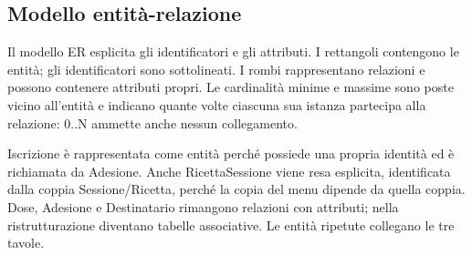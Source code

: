 \documentclass[11pt,a4paper]{article}
\begin{document}
\begin{landscape}
\subsection{Modello entità-relazione}
Il modello ER esplicita gli identificatori e gli attributi. I rettangoli contengono le entità; gli identificatori sono sottolineati. I rombi rappresentano relazioni e possono contenere attributi propri. Le cardinalità minime e massime sono poste vicino all'entità e indicano quante volte ciascuna sua istanza partecipa alla relazione: 0..N ammette anche nessun collegamento.

Iscrizione è rappresentata come entità perché possiede una propria identità ed è richiamata da Adesione. Anche RicettaSessione viene resa esplicita, identificata dalla coppia Sessione/Ricetta, perché la copia del menu dipende da quella coppia. Dose, Adesione e Destinatario rimangono relazioni con attributi; nella ristrutturazione diventano tabelle associative. Le entità ripetute collegano le tre tavole.

\end{landscape}
\end{document}
